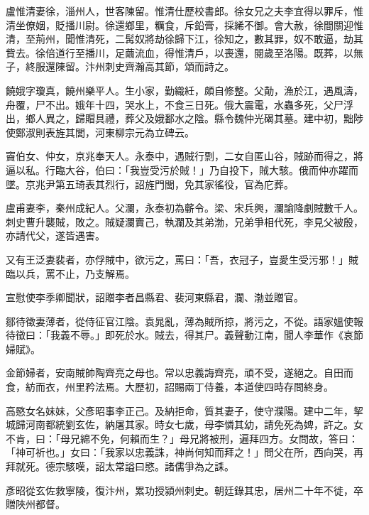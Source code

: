 \begin{pinyinscope}
 盧惟清妻徐，淄州人，世客陳留。惟清仕歷校書郎。徐女兄之夫李宜得以罪斥，惟清坐僚姻，貶播川尉。徐還鄉里，糲食，斥鉛膏，採絺不御。會大赦，徐間關迎惟清，至荊州，聞惟清死，二髯奴將劫徐歸下江，徐知之，數其罪，奴不敢逼，劫其貲去。徐倍道行至播川，足繭流血，得惟清戶，以喪還，閱歲至洛陽。既葬，以無子，終服還陳留。汴州刺史齊瀚高其節，頌而詩之。



 饒娥字瓊真，饒州樂平人。生小家，勤織紝，頗自修整。父勣，漁於江，遇風濤，舟覆，尸不出。娥年十四，哭水上，不食三日死。俄大震電，水蟲多死，父尸浮出，鄉人異之，歸賵具禮，葬父及娥鄱水之陰。縣令魏仲光碣其墓。建中初，黜陟使鄭淑則表旌其閭，河東柳宗元為立碑云。



 竇伯女、仲女，京兆奉天人。永泰中，遇賊行剽，二女自匿山谷，賊跡而得之，將逼以私。行臨大谷，伯曰：「我豈受污於賊！」乃自投下，賊大駭。俄而仲亦躍而墜。京兆尹第五琦表其烈行，詔旌門閭，免其家徭役，官為庀葬。



 盧甫妻李，秦州成紀人。父瀾，永泰初為蘄令。梁、宋兵興，瀾諭降劇賊數千人。刺史曹升襲賊，敗之。賊疑瀾賣己，執瀾及其弟渤，兄弟爭相代死，李見父被殷，亦請代父，遂皆遇害。



 又有王泛妻裴者，亦俘賊中，欲污之，罵曰：「吾，衣冠子，豈愛生受污邪！」賊臨以兵，罵不止，乃支解焉。



 宣慰使李季卿聞狀，詔贈李者昌縣君、裴河東縣君，瀾、渤並贈官。



 鄒待徵妻薄者，從侍征官江陰。袁晁亂，薄為賊所掠，將污之，不從。語家媼使報待徵曰：「我義不辱。」即死於水。賊去，得其尸。義聲動江南，聞人李華作《哀節婦賦》。



 金節婦者，安南賊帥陶齊亮之母也。常以忠義誨齊亮，頑不受，遂絕之。自田而食，紡而衣，州里矜法焉。大歷初，詔賜兩丁侍養，本道使四時存問終身。



 高愍女名妹妹，父彥昭事李正己。及納拒命，質其妻子，使守濮陽。建中二年，挈城歸河南都統劉玄佐，納屠其家。時女七歲，母李憐其幼，請免死為婢，許之。女不肯，曰：「母兄綿不免，何賴而生？」母兄將被刑，遍拜四方。女問故，答曰：「神可祈也。」女曰：「我家以忠義誅，神尚何知而拜之！」問父在所，西向哭，再拜就死。德宗駭嘆，詔太常謚曰愍。諸儒爭為之誄。



 彥昭從玄佐救寧陵，復汴州，累功授潁州刺史。朝廷錄其忠，居州二十年不徙，卒贈陜州都督。




\end{pinyinscope}
